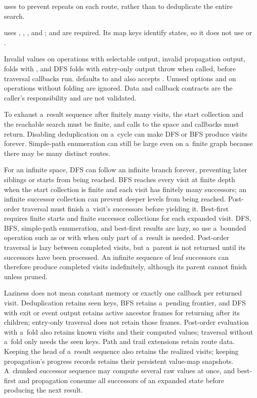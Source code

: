 { uses  to prevent repeats on each route,
rather than to deduplicate the entire search.

 uses , , ,
and ;  and  are required. Its map
keys identify states, so it does not use  or
.

Invalid  values on operations with selectable output, invalid
propagation output, folds with , and DFS folds with
entry-only output throw  when called, before traversal
callbacks run.  defaults to  and also accepts
. Unused options and  on operations without
folding are ignored. Data and callback contracts are the caller's responsibility
and are not validated.

To exhaust a~result sequence after finitely many visits, the start collection
and the reachable search must be finite, and calls to the space and callbacks
must return.
Disabling deduplication on a~cycle can make DFS or BFS produce visits forever.
Simple-path enumeration can still be large even on a~finite graph because
there may be many distinct routes.

For an infinite space, DFS can follow an infinite branch forever, preventing
later siblings or starts from being reached. BFS reaches every visit at
finite depth when the start collection is finite and each visit has finitely
many successors; an infinite successor collection can prevent deeper levels
from being reached.
Post-order traversal must finish a~visit's successors before yielding it.
Best-first requires finite starts and finite successor collections for each
expanded visit. DFS, BFS, simple-path enumeration, and best-first results are
lazy, so use a~bounded operation such as  or  with
 when only part of a~result is needed. Post-order traversal is
lazy between completed visits, but a~parent is not returned until its
successors have been processed.
An infinite sequence of leaf successors can therefore produce completed
visits indefinitely, although its parent cannot finish unless pruned.

Laziness does not mean constant memory or exactly one callback per returned
visit. Deduplication retains seen keys, BFS retains a~pending frontier, and
DFS with exit or event output retains active ancestor frames for returning
after its children; entry-only traversal does not retain those frames.
Post-order evaluation with a~fold also retains known visits and their
computed values; traversal without a~fold only needs the seen keys.
Path and trail extensions retain route data. Keeping the head of a~result
sequence also retains the realized visits; keeping propagation's progress
records retains their persistent value-map snapshots. A~chunked successor
sequence may compute several raw values at once, and best-first and
propagation consume all successors of an expanded state before producing
the next result.

}
